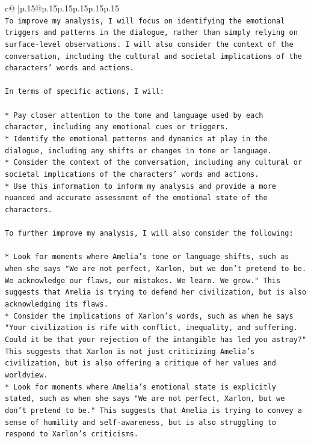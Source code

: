 \documentclass{article}
\begin{document}
{\begin{supertabular}{c@{$\;$}|p{.15\linewidth}@{}p{.15\linewidth}p{.15\linewidth}p{.15\linewidth}p{.15\linewidth}p{.15\linewidth}}
{{{\\ 
\texttt{To improve my analysis, I will focus on identifying the emotional triggers and patterns in the dialogue, rather than simply relying on surface{-}level observations. I will also consider the context of the conversation, including the cultural and societal implications of the characters' words and actions.} \\
\\ 
\texttt{In terms of specific actions, I will:} \\
\\ 
\texttt{* Pay closer attention to the tone and language used by each character, including any emotional cues or triggers.} \\
\texttt{* Identify the emotional patterns and dynamics at play in the dialogue, including any shifts or changes in tone or language.} \\
\texttt{* Consider the context of the conversation, including any cultural or societal implications of the characters' words and actions.} \\
\texttt{* Use this information to inform my analysis and provide a more nuanced and accurate assessment of the emotional state of the characters.} \\
\\ 
\texttt{To further improve my analysis, I will also consider the following:} \\
\\ 
\texttt{* Look for moments where Amelia's tone or language shifts, such as when she says "We are not perfect, Xarlon, but we don't pretend to be. We acknowledge our flaws, our mistakes. We learn. We grow." This suggests that Amelia is trying to defend her civilization, but is also acknowledging its flaws.} \\
\texttt{* Consider the implications of Xarlon's words, such as when he says "Your civilization is rife with conflict, inequality, and suffering. Could it be that your rejection of the intangible has led you astray?" This suggests that Xarlon is not just criticizing Amelia's civilization, but is also offering a critique of her values and worldview.} \\
\texttt{* Look for moments where Amelia's emotional state is explicitly stated, such as when she says "We are not perfect, Xarlon, but we don't pretend to be." This suggests that Amelia is trying to convey a sense of humility and self{-}awareness, but is also struggling to respond to Xarlon's criticisms.} \\
\\ 
}}}
\end{supertabular}}
\end{document}
